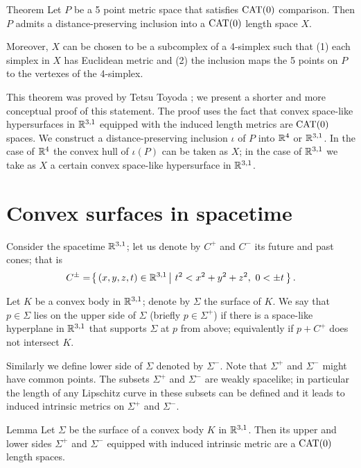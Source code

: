 \documentclass{article}
\begin{document}
\begin{thm}{Theorem}
Let $P$ be a 5 point metric space that satisfies $\mathrm{CAT}(0)$ comparison.
Then $P$ admits a distance-preserving inclusion into a $\mathrm{CAT}(0)$ length space $X$.

Moreover,
$X$ can be chosen to be a subcomplex of a 4-simplex such that (1) each simplex in $X$ has Euclidean metric and (2) the inclusion maps the 5 points on $P$ to the vertexes of the 4-simplex.
\end{thm}

This theorem was proved by Tetsu Toyoda \cite{toyoda};
we present a shorter and more conceptual proof of this statement.
The proof uses the fact that convex space-like hypersurfaces in $\mathbb{R}^{3,1}$ equipped with the induced length metrics are $\mathrm{CAT}(0)$ spaces.
We construct a distance-preserving inclusion $\iota$ of $P$ into $\mathbb{R}^4$ or $\mathbb{R}^{3,1}$.
In the case of $\mathbb{R}^4$ the convex hull of $\iota(P)$ can be taken as $X$;
in the case of $\mathbb{R}^{3,1}$ we take as $X$ a certain convex space-like hypersurface in $\mathbb{R}^{3,1}$.





\section{Convex surfaces in spacetime}

Consider the spacetime $\mathbb{R}^{3,1}$;
let us denote by $C^+$ and $C^-$ its future and past cones;
that is
\[C^\pm=\set{(x,y,z,t)\in\RR^{3,1}}{t^2<x^2+y^2+z^2,\ 0<\pm t}.\]

Let $K$ be a convex body in $\mathbb{R}^{3,1}$;
denote by $\Sigma$ the surface of $K$. 
We say that $p\in \Sigma$ lies on the upper side of $\Sigma$ (briefly $p\in\Sigma^+$) if there is a space-like hyperplane in $\mathbb{R}^{3,1}$ that supports $\Sigma$ at $p$ from above;
equivalently if $p+C^+$ does not intersect $K$.

Similarly we define lower side of $\Sigma$ denoted by $\Sigma^-$.
Note that $\Sigma^+$ and $\Sigma^-$ might have common points.
The subsets $\Sigma^+$ and $\Sigma^-$ are weakly spacelike;
in particular the length of any Lipschitz curve in these subsets can be defined and it leads to induced intrinsic metrics on $\Sigma^+$ and $\Sigma^-$. 

\begin{thm}{Lemma}\label{lem:sides}
Let $\Sigma$ be the surface of a convex body $K$ in $\mathbb{R}^{3,1}$.
Then its upper and lower sides $\Sigma^+$ and $\Sigma^-$ equipped with induced intrinsic metric are a $\mathrm{CAT}(0)$ length spaces. 
\end{thm}
\end{document}
